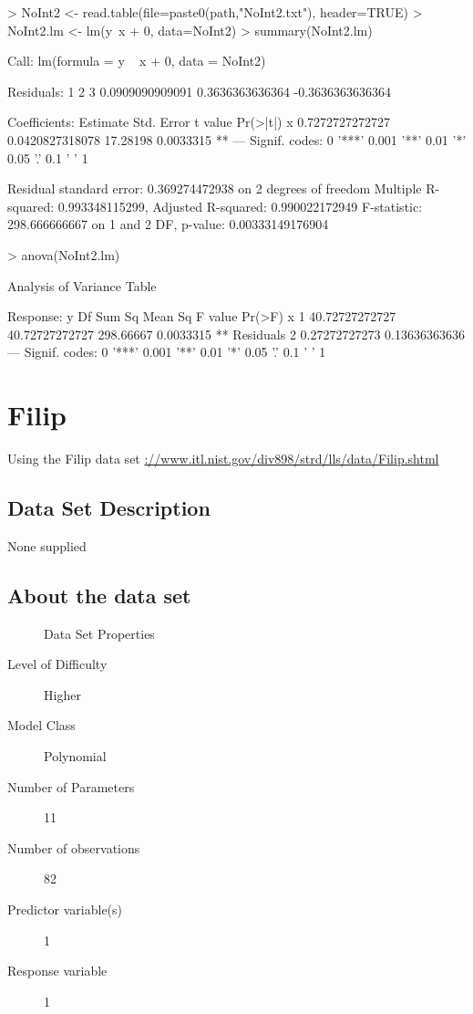 \documentclass[10pt]{article}
\begin{document}
\begin{Schunk}
\begin{Sinput}
> NoInt2 <- read.table(file=paste0(path,"NoInt2.txt"), header=TRUE)
> NoInt2.lm <- lm(y~x + 0, data=NoInt2)
> summary(NoInt2.lm)
\end{Sinput}
\begin{Soutput}
Call:
lm(formula = y ~ x + 0, data = NoInt2)

Residuals:
               1                2                3 
 0.0909090909091  0.3636363636364 -0.3636363636364 

Coefficients:
         Estimate      Std. Error  t value  Pr(>|t|)   
x 0.7272727272727 0.0420827318078 17.28198 0.0033315 **
---
Signif. codes:  0 '***' 0.001 '**' 0.01 '*' 0.05 '.' 0.1 ' ' 1

Residual standard error: 0.369274472938 on 2 degrees of freedom
Multiple R-squared:  0.993348115299,	Adjusted R-squared:  0.990022172949 
F-statistic: 298.666666667 on 1 and 2 DF,  p-value: 0.00333149176904
\end{Soutput}
\begin{Sinput}
> anova(NoInt2.lm)
\end{Sinput}
\begin{Soutput}
Analysis of Variance Table

Response: y
          Df         Sum Sq        Mean Sq   F value    Pr(>F)   
x          1 40.72727272727 40.72727272727 298.66667 0.0033315 **
Residuals  2  0.27272727273  0.13636363636                       
---
Signif. codes:  0 '***' 0.001 '**' 0.01 '*' 0.05 '.' 0.1 ' ' 1
\end{Soutput}
\end{Schunk}


\section{Filip}
Using the Filip data set \url{://www.itl.nist.gov/div898/strd/lls/data/Filip.shtml}

\subsection*{Data Set Description}
None supplied


\subsection*{About the data set}

\begin{description}
   \item[]Data Set Properties
   \item[Level of Difficulty] Higher
   \item[Model Class] Polynomial
   \item[Number of Parameters] 11
   \item[Number of observations]82
   \item[Predictor variable(s)]1
   \item[Response variable]1
\end{description}
\end{document}
